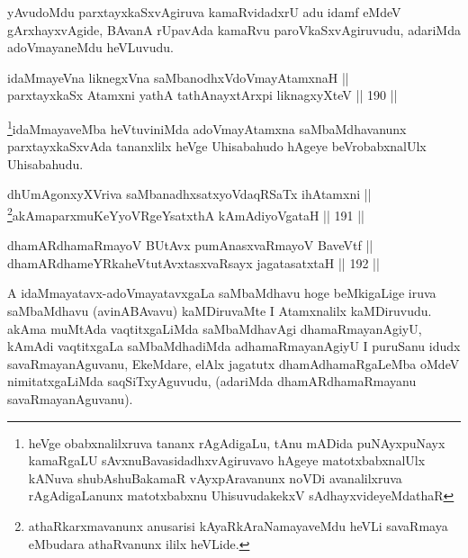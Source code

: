 \begin{artha}
yAvudoMdu parxtayxkaSxvAgiruva kamaRvidadxrU adu idamf eMdeV
gArxhayxvAgide, BAvanA rUpavAda kamaRvu paroVkaSxvAgiruvudu, adariMda
adoVmayaneMdu heVLuvudu.
\end{artha}

\begin{shl}
idaMmayeVna liknegxVna saMbanodhxV\s doVmayAtamxnaH || \\
parxtayxkaSx Atamxni yathA tathA\s nayxtArxpi liknagxyXteV \hfill || 190 ||  
\end{shl}

\begin{artha}
\footnote{heVge obabxnalilxruva tananx rAgAdigaLu, tAnu mADida puNAyxpuNayx kamaRgaLU sAvxnuBavasidadhxvAgiruvavo hAgeye matotxbabxnalUlx kANuva shubAshuBakamaR vAyxpAravanunx noVDi avanalilxruva rAgAdigaLanunx matotxbabxnu UhisuvudakekxV sAdhayxvideyeMdathaR}idaMmayaveMba heVtuviniMda adoVmayAtamxna saMbaMdhavanunx parxtayxkaSxvAda tananxlilx heVge Uhisabahudo hAgeye beVrobabxnalUlx Uhisabahudu.
\end{artha}


\begin{shl}
dhUmAgonxyXVriva saMbanadhxsatxyoVdaqRSaTx ihA\s \s tamxni || \\
\footnote{athaRkarxmavanunx anusarisi kAyaRkAraNamayaveMdu heVLi savaRmaya eMbudara athaRvanunx ililx heVLide.}akAmaparxmuKeYyoVRgeYsatxthA kAmAdiyoVgataH \hfill || 191 || 
\end{shl}


\begin{shl}
dhamARdhamaRmayoV BUtAvx pumAnasxvaRmayoV BaveVtf || \\
dhamARdhameYRkaheVtutAvxtasxvaRsayx jagatasatxtaH \hfill || 192 ||  
\end{shl}

\begin{artha}
A idaMmayatavx-adoVmayatavxgaLa saMbaMdhavu hoge
beMkigaLige iruva saMbaMdhavu (avinABAvavu) kaMDiruvaMte I Atamxnalilx
kaMDiruvudu. akAma muMtAda vaqtitxgaLiMda  saMbaMdhavAgi
dhamaRmayanAgiyU, kAmAdi vaqtitxgaLa saMbaMdhadiMda adhamaRmayanAgiyU
I puruSanu idudx savaRmayanAguvanu, EkeMdare, elAlx jagatutx
dhamAdhamaRgaLeMba oMdeV nimitatxgaLiMda saqSiTxyAguvudu, (adariMda
dhamARdhamaRmayanu savaRmayanAguvanu).
\end{artha}



